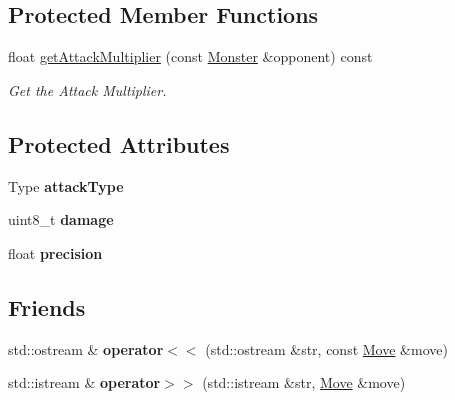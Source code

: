 \subsection*{Protected Member Functions}
\begin{DoxyCompactItemize}
\item 
float \hyperlink{classmonsterbattle_1_1monster_1_1Move_a216e49341b7150e02ad035de8933d6cb}{get\+Attack\+Multiplier} (const \hyperlink{classmonsterbattle_1_1monster_1_1Monster}{Monster} \&opponent) const
\begin{DoxyCompactList}\small\item\em Get the Attack Multiplier. \end{DoxyCompactList}\end{DoxyCompactItemize}
\subsection*{Protected Attributes}
\begin{DoxyCompactItemize}
\item 
\mbox{\label{classmonsterbattle_1_1monster_1_1Move_a9b66e97ee1f1afb8fe4ff0bcd610c2b5}} 
Type {\bfseries attack\+Type}
\item 
\mbox{\label{classmonsterbattle_1_1monster_1_1Move_a54dda7e137f5684f44a4c351a330771e}} 
uint8\+\_\+t {\bfseries damage}
\item 
\mbox{\label{classmonsterbattle_1_1monster_1_1Move_a4d793df5a4bf80a9b233d7759acfe7d0}} 
float {\bfseries precision}
\end{DoxyCompactItemize}
\subsection*{Friends}
\begin{DoxyCompactItemize}
\item 
\mbox{\label{classmonsterbattle_1_1monster_1_1Move_a9a1851b5001ac3722fac876e346bd6c2}} 
std\+::ostream \& {\bfseries operator$<$$<$} (std\+::ostream \&str, const \hyperlink{classmonsterbattle_1_1monster_1_1Move}{Move} \&move)
\item 
\mbox{\label{classmonsterbattle_1_1monster_1_1Move_a04bf3c25ae001fbd4f8e2e650aaa5b85}} 
std\+::istream \& {\bfseries operator$>$$>$} (std\+::istream \&str, \hyperlink{classmonsterbattle_1_1monster_1_1Move}{Move} \&move)
\end{DoxyCompactItemize}


